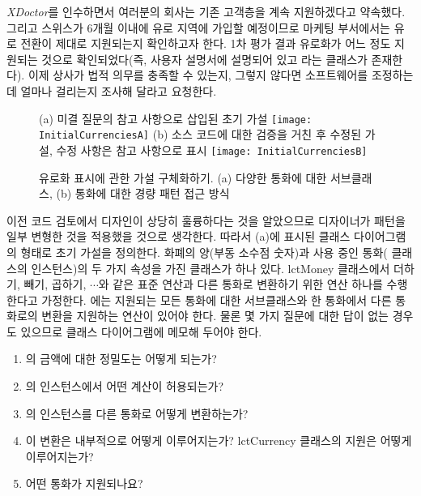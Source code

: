 \documentclass[a4paper,10pt,twoside]{book}
\begin{document}
\emph{XDoctor}를 인수하면서 여러분의 회사는 기존 고객층을 계속 지원하겠다고 약속했다. 그리고 스위스가 6개월 이내에 유로 지역에 가입할 예정이므로 마케팅 부서에서는 유로 전환이 제대로 지원되는지 확인하고자 한다. 1차 평가 결과 유로화가 어느 정도 지원되는 것으로 확인되었다(즉, 사용자 설명서에 설명되어 있고 라는 클래스가 존재한다). 이제 상사가 법적 의무를 충족할 수 있는지, 그렇지 않다면 소프트웨어를 조정하는 데 얼마나 걸리는지 조사해 달라고 요청한다.

\begin{figure}
\begin{center}
{\small (a) 미결 질문의 참고 사항으로 삽입된 초기 가설}
\texttt{[image: InitialCurrenciesA]}
{\small (b) 소스 코드에 대한 검증을 거친 후 수정된 가설, 수정 사항은 참고 사항으로 표시}
\texttt{[image: InitialCurrenciesB]}
\caption{유로화 표시에 관한 가설 구체화하기. (a) 다양한 통화에 대한 서브클래스, (b) 통화에 대한 경량 패턴 접근 방식}
\end{center}
\end{figure}

이전 코드 검토에서 디자인이 상당히 훌륭하다는 것을 알았으므로 디자이너가  패턴을 일부 변형한 것을 적용했을 것으로 생각한다. 따라서  (a)에 표시된 클래스 다이어그램의 형태로 초기 가설을 정의한다. 화폐의 양(부동 소수점 숫자)과 사용 중인 통화( 클래스의 인스턴스)의 두 가지 속성을 가진  클래스가 하나 있다. lct{Money} 클래스에서 더하기, 빼기, 곱하기, $\cdots$와 같은 표준 연산과 다른 통화로 변환하기 위한 연산 하나를 수행한다고 가정한다. 에는 지원되는 모든 통화에 대한 서브클래스와 한 통화에서 다른 통화로의 변환을 지원하는 연산이 있어야 한다. 물론 몇 가지 질문에 대한 답이 없는 경우도 있으므로 클래스 다이어그램에 메모해 두어야 한다.

\begin{enumerate}
  \item {}의 금액에 대한 정밀도는 어떻게 되는가?

  \item {}의 인스턴스에서 어떤 계산이 허용되는가?

  \item {}의 인스턴스를 다른 통화로 어떻게 변환하는가?

  \item 이 변환은 내부적으로 어떻게 이루어지는가? lct{Currency} 클래스의 지원은 어떻게 이루어지는가?

  \item 어떤 통화가 지원되나요?

\end{enumerate}
\end{document}
